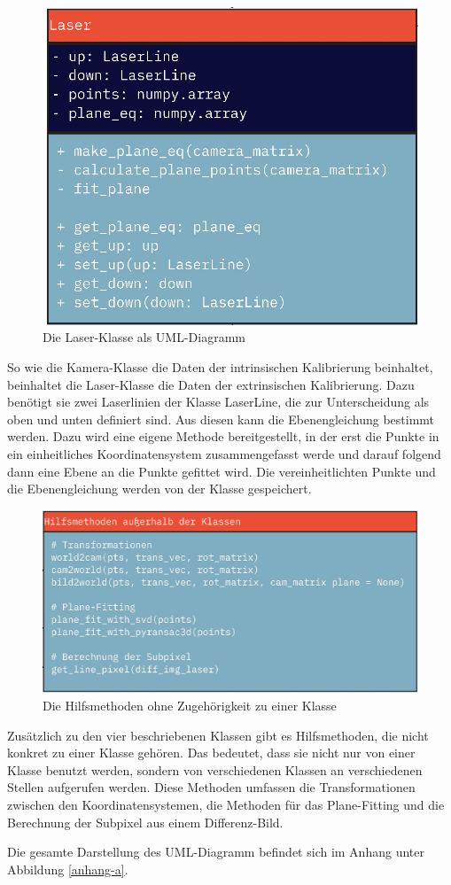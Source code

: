 		\begin{figure}[h]
			\centering
			\includegraphics[width=0.35\linewidth]{img/hauptteil/software/Laser_UML.png}
			\caption{Die Laser-Klasse als UML-Diagramm}
			\label{fig:laser_uml}
		\end{figure}
		So wie die Kamera-Klasse die Daten der intrinsischen Kalibrierung beinhaltet, beinhaltet die Laser-Klasse die Daten der extrinsischen Kalibrierung. Dazu benötigt sie zwei Laserlinien der Klasse LaserLine, die zur Unterscheidung als \glqq oben\grqq{} und \glqq unten\grqq{} definiert sind. Aus diesen kann die Ebenengleichung bestimmt werden. Dazu wird eine eigene Methode bereitgestellt, in der erst die Punkte in ein einheitliches Koordinatensystem zusammengefasst werde und darauf folgend dann eine Ebene an die Punkte gefittet wird. Die vereinheitlichten Punkte und die Ebenengleichung werden von der Klasse gespeichert.
		\newpage
		\begin{figure}[h]
			\centering
			\includegraphics[width=0.7\linewidth]{img/hauptteil/software/Hilfsmethoden_UML.png}
			\caption{Die Hilfsmethoden ohne Zugehörigkeit zu einer Klasse}
			\label{fig:hilfsmethoden_uml}
		\end{figure}
		Zusätzlich zu den vier beschriebenen Klassen gibt es Hilfsmethoden, die nicht konkret zu einer Klasse gehören. Das bedeutet, dass sie nicht nur von einer Klasse benutzt werden, sondern von verschiedenen Klassen an verschiedenen Stellen aufgerufen werden. Diese Methoden umfassen die Transformationen zwischen den Koordinatensystemen, die Methoden für das Plane-Fitting und die Berechnung der Subpixel aus einem Differenz-Bild.
		
		Die gesamte Darstellung des UML-Diagramm befindet sich im Anhang unter Abbildung \ref{anhang-a}.
		
